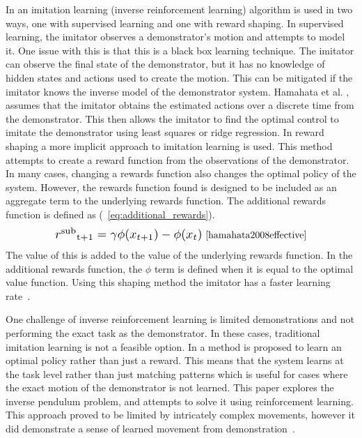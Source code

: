 \documentclass[12pt,american]{report}
\begin{document}
		In \cite{hamahata2008effective} an imitation learning (inverse reinforcement learning) algorithm is used in two ways, one with supervised learning and one with reward shaping. In supervised learning, the imitator observes a demonstrator's motion and attempts to model it. One issue with this is that this is a black box learning technique.  The imitator can observe the final state of the demonstrator, but it has no knowledge of hidden states and actions used to create the motion. This can be mitigated if the imitator knows the inverse model of the demonstrator system. Hamahata et al. \cite{hamahata2008effective}, assumes that the imitator obtains the estimated actions over a discrete time from the demonstrator.  This then allows the imitator to find the optimal control to imitate the demonstrator using least squares or ridge regression. In reward shaping a more implicit approach to imitation learning is used. This method attempts to create a reward function from the observations of the demonstrator.  In many cases, changing a rewards function also changes the optimal policy of the system.  However, the rewards function found is designed to be included as an aggregate term to the underlying rewards function. The additional rewards function is defined as (~\ref{eq:additional_rewards}).
		\begin{equation}
            \label{eq:additional_rewards}
            \resizebox{0.44\textwidth}{!}{$r\textsuperscript{sub}\textsubscript{t+1}= \gamma\phi(x_{t+1})-\phi(x_{t})$}~\cite{hamahata2008effective}
        \end{equation}
		The value of this is added to the value of the underlying rewards function. In the additional rewards function, the \textit{$\phi$} term is defined when it is equal to the optimal value function. Using this shaping method the imitator has a faster learning rate~\cite{hamahata2008effective}.

		One challenge of inverse reinforcement learning is limited demonstrations and not performing the exact task as the demonstrator. In these cases, traditional imitation learning is not a feasible option. In \cite{atkeson1997robot} a method is proposed to learn an optimal policy rather than just a reward. This means that the system learns at the task level rather than just matching patterns which is useful for cases where the exact motion of the demonstrator is not learned. This paper explores the inverse pendulum problem, and attempts to solve it using reinforcement learning. This approach proved to be limited by intricately complex movements, however it did demonstrate a sense of learned movement from demonstration~\cite{atkeson1997robot}.
\end{document}
